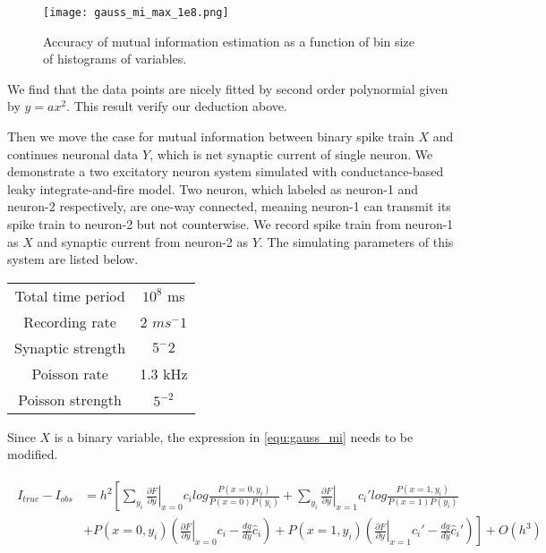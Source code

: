 \documentclass[paper=a4, fontsize=11pt]{article} %
\numberwithin{equation}{section} %
\numberwithin{figure}{section} %
\numberwithin{table}{section} %
\begin{document}
\begin{figure}[H]
	\centering
	\texttt{[image: gauss\_mi\_max\_1e8.png]}
	\caption{Accuracy of mutual information estimation as a function of bin size of histograms of variables.}
	\label{fig:gauss_mi_max}
\end{figure}

We find that the data points are nicely fitted by second order polynormial given by $y= ax^2$. This result verify our deduction above.

Then we move the case for mutual information between binary spike train $X$ and continues neuronal data $Y$, which is net synaptic current of single neuron. We demonstrate a two excitatory neuron system simulated with conductance-based leaky integrate-and-fire model. Two neuron, which labeled as neuron-1 and neuron-2 respectively, are one-way connected, meaning neuron-1 can transmit its spike train to neuron-2 but not counterwise. We record spike train from neuron-1 as $X$ and synaptic current from neuron-2 as $Y$. The simulating parameters of this system are listed below.

\begin{table}[H]
	\centering
	\begin{tabular}{c|c}
		\hline
		\hline
		Total time period & $10^8$ ms \\
		Recording rate & 2 $ms^-1$ \\
		Synaptic strength & $5^-2$ \\
		Poisson rate & 1.3 kHz \\
		Poisson strength & $5^{-2}$ \\
		\hline
		\hline
	\end{tabular}
\end{table}

Since $X$ is a binary variable, the expression in \ref{equ:gauss_mi} needs to be modified.

\begin{align}
	\begin{split}
		I_{true}	- I_{obs} &= h^2\left[\sum_{y_i}\left.\frac{\partial F}{\partial y}\right|_{x=0}c_ilog\frac{P(x=0,y_i)}{P(x=0)P(y_i)} + \sum_{y_i}\left.\frac{\partial F}{\partial y}\right|_{x=1}c_i'log\frac{P(x=1,y_i)}{P(x=1)P(y_i)}\right. \\
		&\left.+ P(x=0,y_i)\left(\left.\frac{\partial F}{\partial y}\right|_{x=0}c_i- \frac{dg}{dy}\hat{c}_i\right) + P(x=1,y_i)\left(\left.\frac{\partial F}{\partial y}\right|_{x=1}c_i' - \frac{dg}{dy}\hat{c}_i'\right)\right] + O(h^3)
	\end{split}
\end{align}
\end{document}
